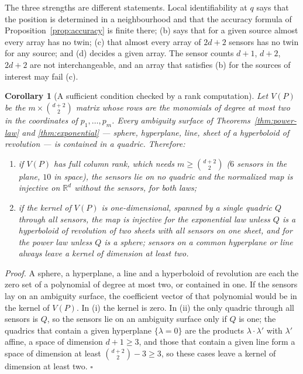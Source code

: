 \documentclass{article}
\newtheorem{corollary}{\bf Corollary}
\begin{document}
The three strengths are different statements. Local identifiability at $q$ says that the position is determined in a neighbourhood and that the accuracy formula of Proposition~\ref{prop:accuracy} is finite there; (b) says that for a given source almost every array has no twin; (c) that almost every array of $2d + 2$ sensors has no twin for any source; and (d) decides a given array. The sensor counts $d + 1$, $d + 2$, $2d + 2$ are not interchangeable, and an array that satisfies (b) for the sources of interest may fail (c).

\begin{corollary}[A sufficient condition checked by a rank computation] \label{cor:quadric}
Let $V(P)$ be the $m \times \binom{d+2}{2}$ matrix whose rows are the monomials of degree at most two in the coordinates of $p_1, \dots, p_m$. Every ambiguity surface of Theorems~\ref{thm:power-law} and \ref{thm:exponential} --- sphere, hyperplane, line, sheet of a hyperboloid of revolution --- is contained in a quadric. Therefore:
\begin{enumerate}
\renewcommand{\labelenumi}{(\roman{enumi})}
\item if $V(P)$ has full column rank, which needs $m \ge \binom{d+2}{2}$ ($6$ sensors in the plane, $10$ in space), the sensors lie on no quadric and the normalized map is injective on $\mathbb{R}^{d}$ without the sensors, for both laws;
\item if the kernel of $V(P)$ is one-dimensional, spanned by a single quadric $Q$ through all sensors, the map is injective for the exponential law unless $Q$ is a hyperboloid of revolution of two sheets with all sensors on one sheet, and for the power law unless $Q$ is a sphere; sensors on a common hyperplane or line always leave a kernel of dimension at least two.
\end{enumerate}
\end{corollary}

\textit{Proof.} A sphere, a hyperplane, a line and a hyperboloid of revolution are each the zero set of a polynomial of degree at most two, or contained in one. If the sensors lay on an ambiguity surface, the coefficient vector of that polynomial would be in the kernel of $V(P)$. In (i) the kernel is zero. In (ii) the only quadric through all sensors is $Q$, so the sensors lie on an ambiguity surface only if $Q$ is one; the quadrics that contain a given hyperplane $\{\lambda = 0\}$ are the products $\lambda \cdot \lambda'$ with $\lambda'$ affine, a space of dimension $d + 1 \ge 3$, and those that contain a given line form a space of dimension at least $\binom{d+2}{2} - 3 \ge 3$, so these cases leave a kernel of dimension at least two. $\square$
\end{document}
